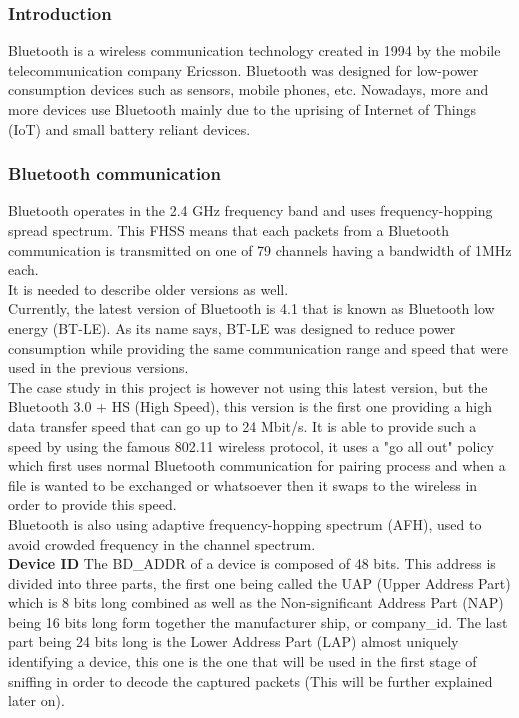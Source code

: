 \subsubsection{Introduction}
Bluetooth is a wireless communication technology created in 1994 by the mobile telecommunication company Ericsson. Bluetooth was designed for low-power consumption devices such as sensors, mobile phones, etc. Nowadays, more and more devices use Bluetooth mainly due to the uprising of Internet of Things (IoT) and small battery reliant devices.

\subsubsection{Bluetooth communication}
Bluetooth operates in the 2.4 GHz frequency band and uses frequency-hopping spread spectrum. This FHSS means that each packets from a Bluetooth communication is transmitted on one of 79 channels having a bandwidth of 1MHz each.
\\
It is needed to describe older versions as well.
\\
Currently, the latest version of Bluetooth is 4.1 that is known as Bluetooth low energy (BT-LE). As its name says, BT-LE was designed to reduce power consumption while providing the same communication range and speed that were used in the previous versions. \\
The case study in this project is however not using this latest version, but the Bluetooth 3.0 + HS (High Speed), this version is  the first one providing a high data transfer speed that can go up to 24 Mbit/s. It is able to provide such a speed by using the famous 802.11 wireless protocol, it uses a "go all out" policy which first uses normal Bluetooth communication for pairing process and when a file is wanted to be exchanged or whatsoever then it swaps to the wireless in order to provide this speed.
\\
Bluetooth is also using adaptive frequency-hopping spectrum (AFH), used to avoid crowded frequency in the channel spectrum.
\\
\textbf{Device ID}
The BD\_ADDR of a device is composed of 48 bits. This address is divided into three parts, the first one being called the UAP (Upper Address Part) which is 8 bits long combined as well as the Non-significant Address Part (NAP) being 16 bits long form together the manufacturer ship, or company\_id. The last part being 24 bits long is the Lower Address Part (LAP) almost uniquely identifying a device, this one is the one that will be used in the first stage of sniffing in order to decode the captured packets (This will be further explained later on). 

